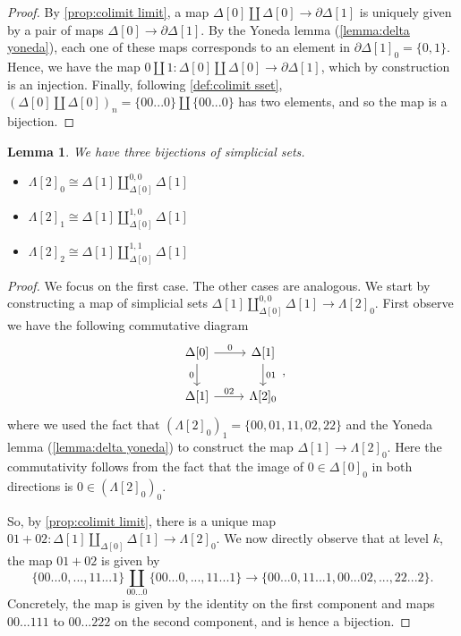\documentclass[11pt, a4paper]{amsart}
\newtheorem{lemma}[equation]{Lemma}
\theoremstyle{definition}
\theoremstyle{remark}
\numberwithin{equation}{section}
\begin{document}
\begin{proof}
 By \cref{prop:colimit limit}, a map $\Delta[0] \coprod \Delta[0] \to \partial \Delta[1]$ is uniquely given by a pair of maps $\Delta[0] \to \partial \Delta[1]$. By the Yoneda lemma (\cref{lemma:delta yoneda}), each one of these maps corresponds to an element in $\partial \Delta[1]_0 = \{0,1\}$. Hence, we have the map $0 \coprod 1 \colon \Delta[0] \coprod \Delta[0] \to \partial \Delta[1]$, which by construction is an injection. Finally, following \cref{def:colimit sset}, $(\Delta[0] \coprod \Delta[0])_n = \{00...0\} \coprod \{ 00 ... 0\}$ has two elements, and so the map is a bijection.
\end{proof}

\begin{lemma} \label{lemma:horn colimit}
  We have three bijections of simplicial sets.
  \begin{itemize}
    \item $\Lambda[2]_0 \cong \Delta[1] \coprod^{0,0}_{\Delta[0]} \Delta[1]$
    \item $\Lambda[2]_1 \cong \Delta[1] \coprod^{1,0}_{\Delta[0]} \Delta[1]$
    \item $\Lambda[2]_2 \cong \Delta[1] \coprod^{1,1}_{\Delta[0]} \Delta[1]$
  \end{itemize}
\end{lemma}

\begin{proof}
 We focus on the first case. The other cases are analogous. We start by constructing a map of simplicial sets $\Delta[1] \coprod^{0,0}_{\Delta[0]} \Delta[1] \to \Lambda[2]_0$. First observe we have the following commutative diagram
 \[ 
 \begin{tikzcd}
  \Delta[0] \arrow[r, "0"] \arrow[d, "0"'] & \Delta[1] \arrow[d, "01"] \\
  \Delta[1] \arrow[r, "02"] & \Lambda[2]_0
 \end{tikzcd},
 \]
 where we used the fact that $(\Lambda[2]_0)_1 = \{00, 01, 11, 02, 22\}$ and the Yoneda lemma (\cref{lemma:delta yoneda}) to construct the map $\Delta[1] \to \Lambda[2]_0$. Here the commutativity follows from the fact that the image of $0 \in \Delta[0]_0$ in both directions is $0 \in (\Lambda[2]_0)_0$. 

 So, by \cref{prop:colimit limit}, there is a unique map $01 + 02\colon\Delta[1] \coprod_{\Delta[0]} \Delta[1] \to \Lambda[2]_0$. We now directly observe that at level $k$, the map $01 + 02$ is given by 
 \[\{00... 0, ... , 11 ... 1\} \coprod_{00...0} \{00... 0, ... , 11 ...1\} \to \{00... 0, 11...1,00...02, ... , 22...2\}. \]
 Concretely, the map is given by the identity on the first component and maps $00...111$ to $00...222$ on the second component, and is hence a bijection.
\end{proof}
\end{document}
